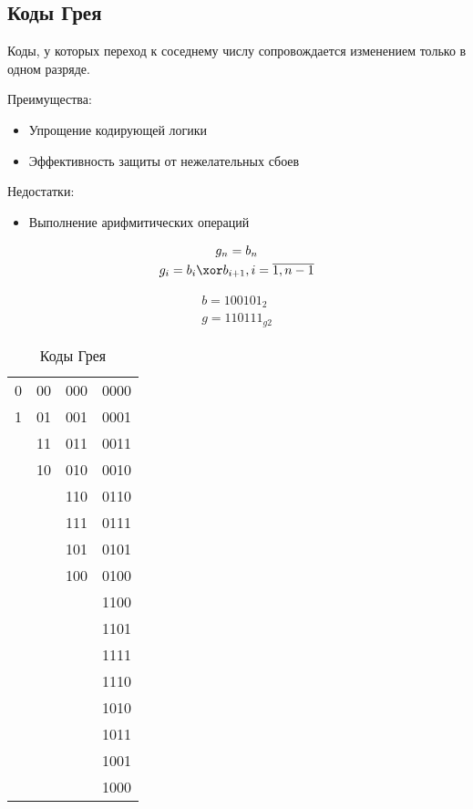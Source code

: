 \subsection{Коды Грея}

\begin{definition}
  Коды, у которых переход к соседнему числу сопровождается изменением только в одном разряде.
\end{definition}

Преимущества:
\begin{itemize}
  \item Упрощение кодирующей логики
  \item Эффективность защиты от нежелательных сбоев
\end{itemize}

Недостатки:
\begin{itemize}
  \item Выполнение арифмитических операций
\end{itemize}

\begin{gather*}
  g_n = b_n \\
  g_i = b_i \xor b_{i+1}, i = \overline{1, n-1}
\end{gather*}
\begin{eg}
  \begin{gather*}
    b = 100101_2 \\
    g = 110111_{g2}
  \end{gather*}
\end{eg}

\begin{table}[htpb]
  \centering
  \caption{Коды Грея}
  \begin{tabular}{ | c | c | c | c |}
  \hline
  0 & 00 & 000 & 0000 \\
  1 & 01 & 001 & 0001 \\
    & 11 & 011 & 0011 \\
    & 10 & 010 & 0010 \\
    &    & 110 & 0110 \\
    &    & 111 & 0111 \\
    &    & 101 & 0101 \\
    &    & 100 & 0100 \\
    &    &     & 1100 \\
    &    &     & 1101 \\
    &    &     & 1111 \\
    &    &     & 1110 \\
    &    &     & 1010 \\
    &    &     & 1011 \\
    &    &     & 1001 \\
    &    &     & 1000 \\
  \hline
  \end{tabular}
\end{table}

